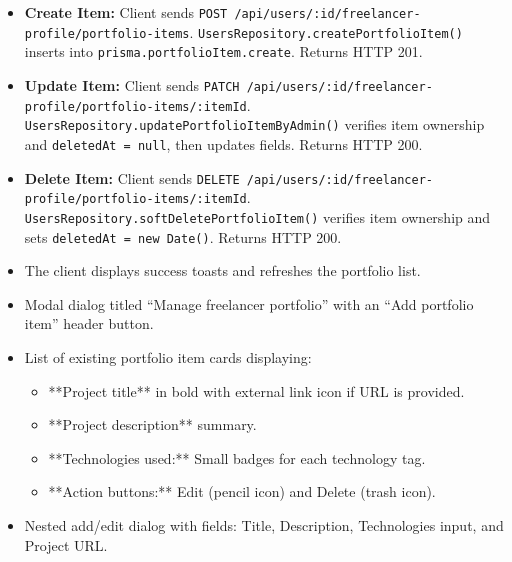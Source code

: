 \begin{itemize}[leftmargin=1.6em,topsep=3pt,itemsep=2pt,parsep=0pt,label=$\bullet$]
    \item \textbf{Create Item:} Client sends \texttt{POST /\allowbreak{}api/\allowbreak{}users/\allowbreak{}:\allowbreak{}id/\allowbreak{}freelancer-\allowbreak{}profile/\allowbreak{}portfolio-\allowbreak{}items}. \texttt{Users\allowbreak{}Repository.\allowbreak{}create\allowbreak{}Portfolio\allowbreak{}Item()} inserts into \texttt{prisma.\allowbreak{}portfolioItem.\allowbreak{}create}. Returns HTTP 201.
    \item \textbf{Update Item:} Client sends \texttt{PATCH /\allowbreak{}api/\allowbreak{}users/\allowbreak{}:\allowbreak{}id/\allowbreak{}freelancer-\allowbreak{}profile/\allowbreak{}portfolio-\allowbreak{}items/\allowbreak{}:\allowbreak{}itemId}. \texttt{Users\allowbreak{}Repository.\allowbreak{}update\allowbreak{}Portfolio\allowbreak{}Item\allowbreak{}By\allowbreak{}Admin()} verifies item ownership and \texttt{deletedAt = null}, then updates fields. Returns HTTP 200.
    \item \textbf{Delete Item:} Client sends \texttt{DELETE /\allowbreak{}api/\allowbreak{}users/\allowbreak{}:\allowbreak{}id/\allowbreak{}freelancer-\allowbreak{}profile/\allowbreak{}portfolio-\allowbreak{}items/\allowbreak{}:\allowbreak{}itemId}. \texttt{Users\allowbreak{}Repository.\allowbreak{}soft\allowbreak{}Delete\allowbreak{}Portfolio\allowbreak{}Item()} verifies item ownership and sets \texttt{deletedAt = new Date()}. Returns HTTP 200.
    \item The client displays success toasts and refreshes the portfolio list.
\end{itemize}

\begin{itemize}[leftmargin=1.6em,topsep=3pt,itemsep=2pt,parsep=0pt,label=$\bullet$]
    \item Modal dialog titled ``Manage freelancer portfolio'' with an ``Add portfolio item'' header button.
    \item List of existing portfolio item cards displaying:
        \begin{itemize}[leftmargin=1.6em,topsep=2pt,itemsep=2pt,parsep=0pt]
            \item **Project title** in bold with external link icon if URL is provided.
            \item **Project description** summary.
            \item **Technologies used:** Small badges for each technology tag.
            \item **Action buttons:** Edit (pencil icon) and Delete (trash icon).
        \end{itemize}
    \item Nested add/edit dialog with fields: Title, Description, Technologies input, and Project URL.
\end{itemize}

